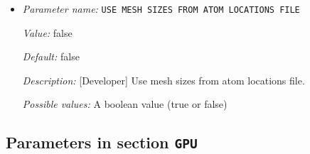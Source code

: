 \begin{itemize}
{\it Value:} false


{\it Default:} false


{\it Description:} [Developer] Use a composite generator flat top and Gaussian generator for mesh movement and configurational force computation.


{\it Possible values:} A boolean value (true or false)
\item {\it Parameter name:} {\tt USE MESH SIZES FROM ATOM LOCATIONS FILE}
\label{parameters:Finite element mesh parameters/Auto mesh generation parameters/USE MESH SIZES FROM ATOM LOCATIONS FILE}
\label{parameters:Finite_20element_20mesh_20parameters/Auto_20mesh_20generation_20parameters/USE_20MESH_20SIZES_20FROM_20ATOM_20LOCATIONS_20FILE}


{\it Value:} false


{\it Default:} false


{\it Description:} [Developer] Use mesh sizes from atom locations file.


{\it Possible values:} A boolean value (true or false)
\end{itemize}

\subsection{Parameters in section \tt GPU}
\label{parameters:GPU}


